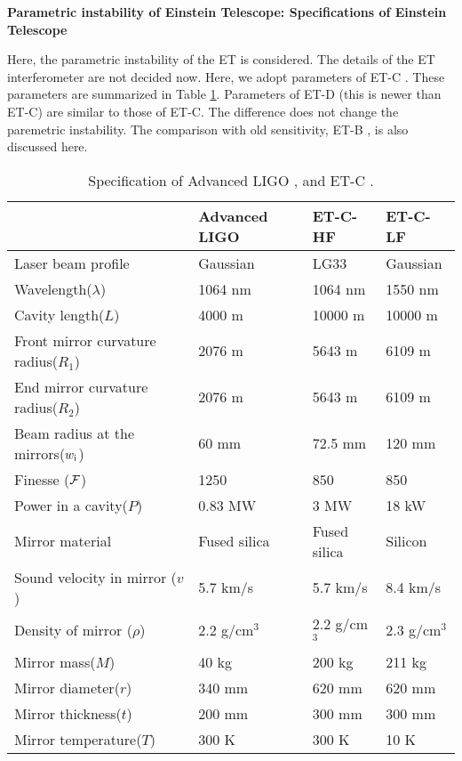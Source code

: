\textbf{Parametric instability of Einstein Telescope: Specifications of Einstein Telescope}
\nopagebreak

Here, the parametric instability of the ET is
considered. The details of the ET interferometer are not decided
now. Here, we adopt parameters of ET-C \cite{Hild2010a}. 
These parameters are summarized in Table
\ref{tab:specification2}. Parameters of ET-D \cite{Hild2010b} (this is newer than ET-C) 
are similar to those of ET-C. 
The difference does not change the paremetric instability. The comparison with old sensitivity,
ET-B \cite{HildETconventional,Yamamoto2009}, is also discussed here.  
\begin{table}[h]
\begin{center}
\begin{tabular}{llll}
\hline
\hline
 &Advanced LIGO&ET-C-HF&ET-C-LF\\
\hline
Laser beam profile&Gaussian&LG33&Gaussian\\
Wavelength($\lambda$)&1064 nm&1064 nm&1550 nm\\
Cavity length($L$)&4000 m&10000 m&10000 m\\
Front mirror curvature radius($R_1$)&2076 m&5643 m&6109 m\\
End mirror curvature radius($R_2$)&2076 m&5643 m&6109 m\\
Beam radius at the mirrors($w_{\rm i}$)&60 mm&72.5 mm&120 mm\\
Finesse (${\cal F}$) & 1250 & 850 & 850 \\
Power in a cavity($P$) &0.83 MW&3 MW&18 kW\\
Mirror material&Fused silica&Fused silica&Silicon\\
Sound velocity in mirror ($v$) &5.7 km/s&5.7 km/s&8.4 km/s\\
Density of mirror ($\rho$) &2.2 g/cm$^3$&2.2 g/cm$^3$&2.3 g/cm$^3$\\
Mirror mass($M$)&40 kg&200 kg& 211 kg \\
Mirror diameter($r$)&340 mm&620 mm&620 mm\\
Mirror thickness($t$)&200 mm&300 mm&300 mm\\
Mirror temperature($T$)&300 K&300 K&10 K\\
\hline
\hline
\end{tabular}
\end{center}
\caption{Specification of Advanced LIGO
\cite{Ju2006a,Ju2006b,Zhao2005}, and ET-C
\cite{Hild2010a}.\label{tab:specification2}}
\end{table}

